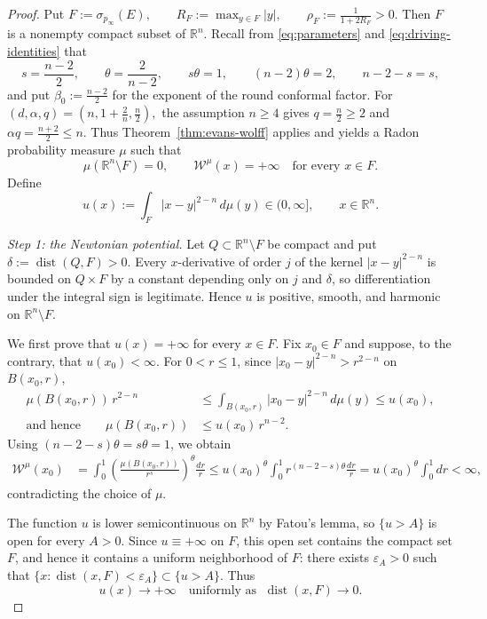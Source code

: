 \documentclass[12pt,oneside,a4paper]{article}
\theoremstyle{mytheorem}
\theoremstyle{remark}
\theoremstyle{definition}
\begin{document}
\begin{proof}
Put
$F:=\sigma_{p_\infty}(E),\qquad
R_F:=\max_{y\in F}|y|,\qquad
\rho_F:=\frac{1}{1+2R_F}>0.$
Then $F$ is a nonempty compact subset of $\mathbb{R}^n$.  Recall from
\eqref{eq:parameters} and \eqref{eq:driving-identities} that
\[
 s=\frac{n-2}{2},
 \qquad
 \theta=\frac{2}{n-2},
 \qquad
 s\theta=1,
 \qquad
 (n-2)\theta=2,
 \qquad
 n-2-s=s,
\]
and put $\beta_0:=\frac{n-2}{2}$ for the exponent of the round conformal
factor.  For
$(d,\alpha,q)=\left(n,1+\frac2n,\frac n2\right),$
the assumption $n\ge4$ gives $q=\frac n2\ge2$ and
$\alpha q=\frac{n+2}{2}\le n$.  Thus Theorem~\ref{thm:evans-wolff} applies and
yields a Radon probability measure $\mu$ such that
\[
 \mu(\mathbb R^n\setminus F)=0,
 \qquad
 \mathcal{W}^{\mu}(x)=+\infty
 \quad\text{for every }x\in F.
\]
Define
\[
 u(x):=\int_F|x-y|^{2-n}\,d\mu(y)
 \in(0,\infty],
 \qquad x\in\mathbb{R}^n.
\]

\smallskip\noindent
\emph{Step 1: the Newtonian potential.}
Let $Q\subset\mathbb{R}^n\setminus F$ be compact and put
$\delta:=\operatorname{dist}(Q,F)>0$.  Every $x$-derivative of order
$j$ of the kernel $|x-y|^{2-n}$ is bounded on $Q\times F$ by a constant
depending only on $j$ and $\delta$, so differentiation under the
integral sign is legitimate.  Hence $u$ is positive, smooth, and
harmonic on $\mathbb{R}^n\setminus F$.

We first prove that $u(x)=+\infty$ for every $x\in F$.
Fix $x_0\in F$ and suppose, to the contrary, that $u(x_0)<\infty$.
For $0<r\le1$, since $|x_0-y|^{2-n}>r^{2-n}$ on $B(x_0,r)$,
\[
\begin{aligned}
 \mu(B(x_0,r))\,r^{2-n}
 &\le
 \int_{B(x_0,r)}|x_0-y|^{2-n}\,d\mu(y)
 \le
 u(x_0),\\
 \text{and hence}\qquad
 \mu(B(x_0,r))
 &\le
 u(x_0)\,r^{n-2}.
\end{aligned}
\]
Using $(n-2-s)\theta=s\theta=1$, we obtain
\begin{align*}
 \mathcal{W}^{\mu}(x_0)
 &=
 \int_0^1
 \left(
 \frac{\mu(B(x_0,r))}{r^s}
 \right)^\theta\frac{dr}{r}
 \le
 u(x_0)^\theta
 \int_0^1
 r^{(n-2-s)\theta}\frac{dr}{r}
 =
 u(x_0)^\theta\int_0^1dr
 <\infty,
\end{align*}
contradicting the choice of $\mu$.

The function $u$ is lower semicontinuous on $\mathbb{R}^n$ by Fatou's
lemma, so $\{u>A\}$ is open for every $A>0$.  Since $u\equiv+\infty$ on
$F$, this open set contains the compact set $F$, and hence it contains
a uniform neighborhood of $F$: there exists $\varepsilon_A>0$ such that
$\bigl\{x:\operatorname{dist}(x,F)<\varepsilon_A\bigr\}\subset\{u>A\}$.
Thus
\begin{equation}\label{eq:u-divergence}
 u(x)\longrightarrow+\infty
 \quad\text{uniformly as }\;
 \operatorname{dist}(x,F)\longrightarrow0.
\end{equation}


\end{proof}
\end{document}
